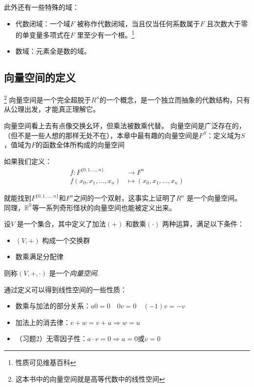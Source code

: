 此外还有一些特殊的域：
\begin{itemize}
    \item 代数闭域：一个域\(F\) 被称作代数闭域，当且仅当任何系数属于\(F\)
        且次数大于零的单变量多项式在\(F\) 里至少有一个根。\footnote{性质可见维基百科}
    \item 数域：元素全是数的域。
\end{itemize}

\subsection{向量空间的定义}\footnote{这本书中的向量空间就是高等代数中的线性空间}
向量空间是一个完全超脱于\(R^{n}\)的一个概念，是一个独立而抽象的代数结构，只有从公理出发，才能真正理解它。

向量空间看上去有点像交换幺环，但乘法被数乘代替。
向量空间是广泛存在的，（但不是一些人想的那样无处不在），本章中最有趣的向量空间是\(F^{S}\)：定义域为\(S\)，值域为\(F\)的函数全体所构成的向量空间

如果我们定义：
\[
    \begin{aligned}
        f: F^{\{0,1,\ldots,n\}} &\to F^{n}\\
        f(x_{0}, x_{1}, \ldots, x_{n}) &\mapsto (x_{0},
        x_{1}, \ldots, x_{n})
    \end{aligned}
\]

就能找到\(F^{\{0,1,\ldots,n\}}\)和\(F^{n}\)之间的一个双射，这事实上证明了\(R^{n}\)
是一个向量空间。
同理，\(\mathbb{R}^{\mathbb{R}}\)等一系列奇形怪状的向量空间也能被定义出来。
\begin{definition}
    设\(V\) 是一个集合，其中定义了加法\((+)\) 和数乘\((\cdot)\) 两种运算，满足以下条件：
    \begin{itemize}
        \item \((V, +)\) 构成一个交换群
        \item 数乘满足分配律
    \end{itemize}
    则称\((V, +, \cdot)\) 是一个\emph{向量空间}.
\end{definition}

通过定义可以得到线性空间的一些性质：
\begin{itemize}
    \item 数乘与加法的部分关系：\(a0=0\quad 0v=0\quad (-1)v=-v\)
    \item 加法上的消去律：\(v+w=v+u \Rightarrow w=u \)
    \item （习题2）无零因子性：\(a\cdot v=0 \Rightarrow a=0
        \text{或} v=0\)
\end{itemize}

